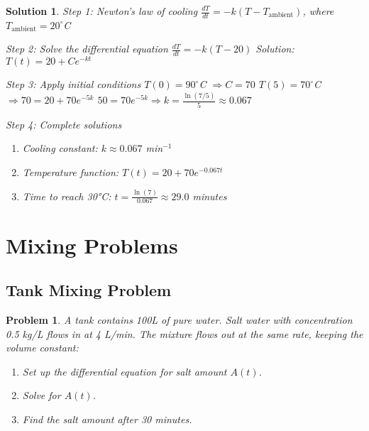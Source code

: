 \documentclass[12pt, letterpaper]{book}
\newcounter{problemcounter}[chapter]
\theoremstyle{problemstyle}
\newtheorem{problem}[problemcounter]{Problem}
\theoremstyle{solutionstyle}
\newtheorem*{solution}{Solution}
\begin{document}
\begin{solution}
\textit{Step 1: Newton's law of cooling}
$\frac{dT}{dt} = -k(T - T_{\text{ambient}})$, where $T_{\text{ambient}} = 20^\circ$C

\textit{Step 2: Solve the differential equation}
$\frac{dT}{dt} = -k(T - 20)$
Solution: $T(t) = 20 + Ce^{-kt}$

\textit{Step 3: Apply initial conditions}
$T(0) = 90^\circ$C $\Rightarrow C = 70$
$T(5) = 70^\circ$C $\Rightarrow 70 = 20 + 70e^{-5k}$
$50 = 70e^{-5k} \Rightarrow k = \frac{\ln(7/5)}{5} \approx 0.067$

\textit{Step 4: Complete solutions}
\begin{enumerate}
    \item Cooling constant: $k \approx 0.067$ min$^{-1}$
    \item Temperature function: $T(t) = 20 + 70e^{-0.067t}$
    \item Time to reach 30°C: $t = \frac{\ln(7)}{0.067} \approx 29.0$ minutes
\end{enumerate}
\end{solution}

\section{Mixing Problems}

\subsection{Tank Mixing Problem}

\begin{problem}
A tank contains 100L of pure water. Salt water with concentration 0.5 kg/L flows in at 4 L/min. The mixture flows out at the same rate, keeping the volume constant:
\begin{enumerate}
    \item Set up the differential equation for salt amount $A(t)$.
    \item Solve for $A(t)$.
    \item Find the salt amount after 30 minutes.
\end{enumerate}
\end{problem}
\end{document}
